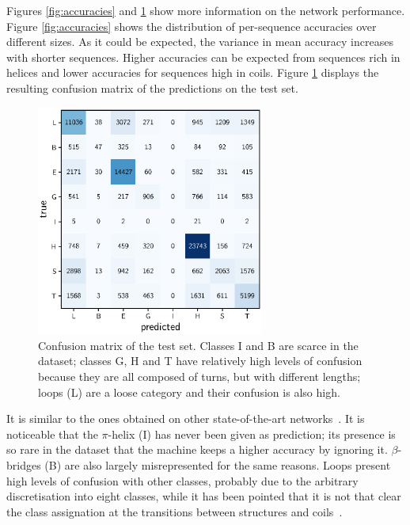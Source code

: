 \documentclass{article}
\begin{document}
Figures \ref{fig:accuracies} and \ref{fig:confusion} show more information on the network performance. Figure \ref{fig:accuracies} shows the distribution of per-sequence accuracies over different sizes.
As it could be expected, the variance in mean accuracy increases with shorter sequences. Higher accuracies can be expected from sequences rich in helices and lower accuracies for sequences high in coils. Figure \ref{fig:confusion} displays the resulting confusion matrix of the predictions on the test set.
\begin{figure}[t]
	\centering
	\centerline{\includegraphics[width=7.5cm]{confusion}}
	\caption{Confusion matrix of the test set. Classes I and B are scarce in the dataset; classes G, H and T have relatively high levels of confusion because they are all composed of turns, but with different lengths; loops (L) are a loose category and their confusion is also high.}
	\label{fig:confusion}
\end{figure}
It is similar to the ones obtained on other state-of-the-art networks~\cite{Fang2017}. It is noticeable that the $\pi$-helix (I) has never been given as prediction; its presence is so rare in the dataset that the machine keeps a higher accuracy by ignoring it. $\beta$-bridges (B) are also largely misrepresented for the same reasons. Loops present high levels of confusion with other classes, probably due to the arbitrary discretisation into eight classes, while it has been pointed that it is not that clear the class assignation at the transitions between structures and coils~\cite{Rost2001}.
\end{document}
